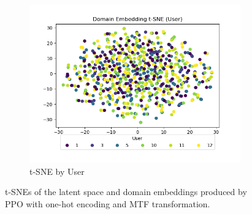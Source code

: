 \begin{figure}
\begin{subfigure}{0.3\textwidth}
		\includegraphics[width=\textwidth]{figures/mtf-ppo-one/de-user}
		\caption{t-SNE by User}
		\label{fig:mtf-ppo-one-de-user}
	\end{subfigure}
	\caption{t-SNEs of the latent space and domain embeddings produced by PPO with one-hot encoding and MTF transformation.}
	\label{fig:mtf-ppo-one}
\end{figure}
